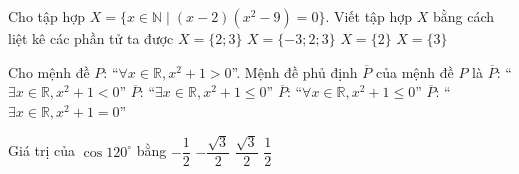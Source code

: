 \begin{ex}
	Cho tập hợp $X = \{x \in \mathbb{N} \mid (x - 2)(x^2 - 9) = 0\}$. Viết tập hợp $X$ bằng cách liệt kê các phần tử ta được
	\choice
{\True $X = \{2; 3\}$}
{$X = \{-3; 2; 3\}$}
{$X = \{2\}$}
{$X = \{3\}$}
\loigiai{
		Phương trình $(x - 2)(x^2 - 9) = 0 \Leftrightarrow \left[\begin{array}{l} x = 2 \\ x = 3 \\ x = -3. \end{array}\right.$\\
		Vì $x \in \mathbb{N}$ nên ta nhận $x = 2$ và $x = 3$. Vậy $X = \{2; 3\}$.
	}
\end{ex}

\begin{ex}
	Cho mệnh đề $P$: ``$\forall x \in \mathbb{R}, x^2 + 1 > 0$''. Mệnh đề phủ định $\overline{P}$ của mệnh đề $P$ là
	\choice
{$\overline{P}$: ``$\exists x \in \mathbb{R}, x^2 + 1 < 0$''}
{\True $\overline{P}$: ``$\exists x \in \mathbb{R}, x^2 + 1 \le 0$''}
{$\overline{P}$: ``$\forall x \in \mathbb{R}, x^2 + 1 \le 0$''}
{$\overline{P}$: ``$\exists x \in \mathbb{R}, x^2 + 1 = 0$''}
\end{ex}

\begin{ex}
	Giá trị của $\cos 120^\circ$ bằng
	\choice
{\True $-\dfrac{1}{2}$}
{$-\dfrac{\sqrt{3}}{2}$}
{$\dfrac{\sqrt{3}}{2}$}
{$\dfrac{1}{2}$}
\end{ex}

